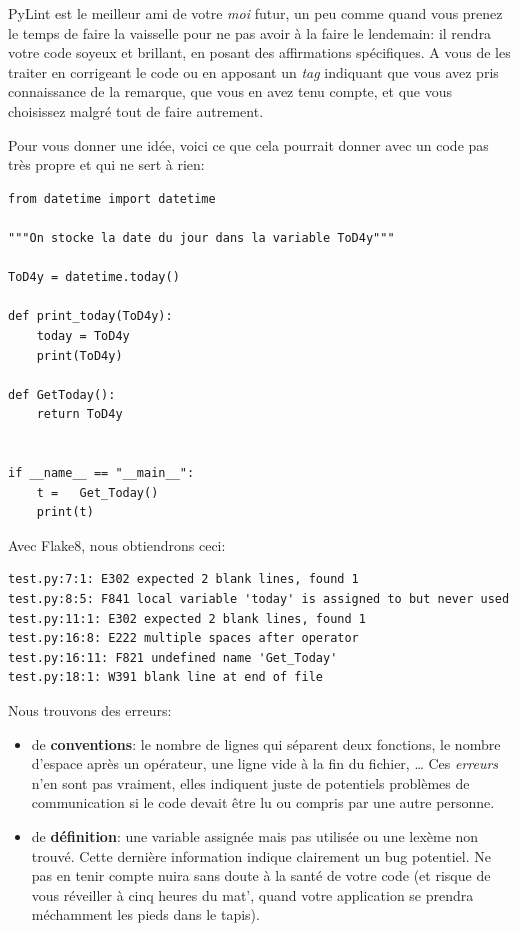\documentclass[11pt]{amsbook}
\begin{document}
PyLint est le meilleur ami de votre \emph{moi} futur, un peu comme quand vous prenez le temps de faire la vaisselle pour ne pas avoir à la faire le lendemain: il rendra votre code soyeux et brillant, en posant des affirmations spécifiques.
A vous de les traiter en corrigeant le code ou en apposant un \emph{tag} indiquant que vous avez pris connaissance de la remarque, que vous en avez tenu compte, et que vous choisissez malgré tout de faire autrement.


Pour vous donner une idée, voici ce que cela pourrait donner avec un code pas très propre et qui ne sert à rien:


\begin{verbatim}
from datetime import datetime

"""On stocke la date du jour dans la variable ToD4y"""

ToD4y = datetime.today()

def print_today(ToD4y):
    today = ToD4y
    print(ToD4y)

def GetToday():
    return ToD4y


if __name__ == "__main__":
    t =   Get_Today()
    print(t)
\end{verbatim}

Avec Flake8, nous obtiendrons ceci:


\begin{verbatim}
test.py:7:1: E302 expected 2 blank lines, found 1
test.py:8:5: F841 local variable 'today' is assigned to but never used
test.py:11:1: E302 expected 2 blank lines, found 1
test.py:16:8: E222 multiple spaces after operator
test.py:16:11: F821 undefined name 'Get_Today'
test.py:18:1: W391 blank line at end of file
\end{verbatim}

Nous trouvons des erreurs:


\begin{itemize}

\item de \textbf{conventions}: le nombre de lignes qui séparent deux fonctions, le nombre d’espace après un opérateur, une ligne vide à la fin du fichier, …​ Ces \emph{erreurs} n’en sont pas vraiment, elles indiquent juste de potentiels problèmes de communication si le code devait être lu ou compris par une autre personne.

\item de \textbf{définition}: une variable assignée mais pas utilisée ou une lexème non trouvé. Cette dernière information indique clairement un bug potentiel. Ne pas en tenir compte nuira sans doute à la santé de votre code (et risque de vous réveiller à cinq heures du mat', quand votre application se prendra méchamment les pieds dans le tapis).

\end{itemize}
\end{document}
